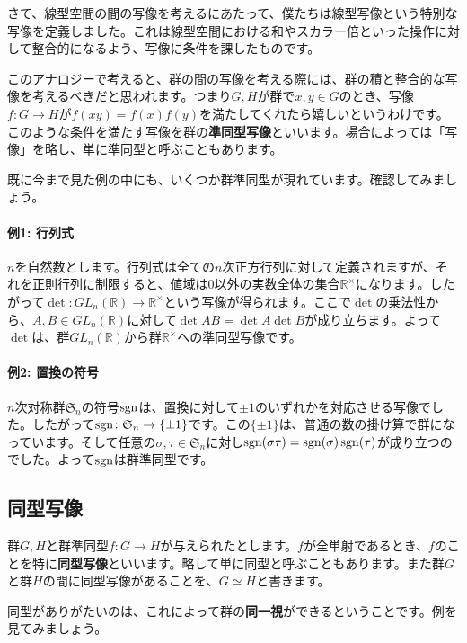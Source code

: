 さて、線型空間の間の写像を考えるにあたって、僕たちは線型写像という特別な写像を定義しました。これは線型空間における和やスカラー倍といった操作に対して整合的になるよう、写像に条件を課したものです。

このアナロジーで考えると、群の間の写像を考える際には、群の積と整合的な写像を考えるべきだと思われます。つまり$G, H$が群で$x, y \in G$のとき、写像$f\colon G \rightarrow H$が$f(xy) = f(x)f(y)$を満たしてくれたら嬉しいというわけです。このような条件を満たす写像を群の\textbf{準同型写像}といいます。場合によっては「写像」を略し、単に準同型と呼ぶこともあります。

既に今まで見た例の中にも、いくつか群準同型が現れています。確認してみましょう。

\paragraph{例1: 行列式}

$n$を自然数とします。行列式は全ての$n$次正方行列に対して定義されますが、それを正則行列に制限すると、値域は$0$以外の実数全体の集合$\mathbb{R}^{\times}$になります。したがって$\det \colon GL_n(\mathbb{R}) \rightarrow \mathbb{R}^{\times}$という写像が得られます。ここで$\det$の乗法性から、$A, B \in GL_n(\mathbb{R})$に対して$\det AB = \det A \det B$が成り立ちます。よって$\det$は、群$GL_n(\mathbb{R})$から群$\mathbb{R}^{\times}$への準同型写像です。

\paragraph{例2: 置換の符号}

$n$次対称群$\mathfrak{S}_n$の符号$\operatorname{sgn}$は、置換に対して$\pm1$のいずれかを対応させる写像でした。したがって$\operatorname{sgn} \colon \mathfrak{S}_n \rightarrow \{\pm1\}$です。この$\{\pm1\}$は、普通の数の掛け算で群になっています。そして任意の$\sigma, \tau \in \mathfrak{S}_n$に対し$\operatorname{sgn}(\sigma \tau) = \operatorname{sgn}(\sigma) \operatorname{sgn}(\tau)$が成り立つのでした。よって$\operatorname{sgn}$は群準同型です。

\subsection{同型写像}

群$G, H$と群準同型$f\colon G\rightarrow H$が与えられたとします。$f$が全単射であるとき、$f$のことを特に\textbf{同型写像}といいます。略して単に同型と呼ぶこともあります。また群$G$と群$H$の間に同型写像があることを、$G \simeq H$と書きます。

同型がありがたいのは、これによって群の\textbf{同一視}ができるということです。例を見てみましょう。

